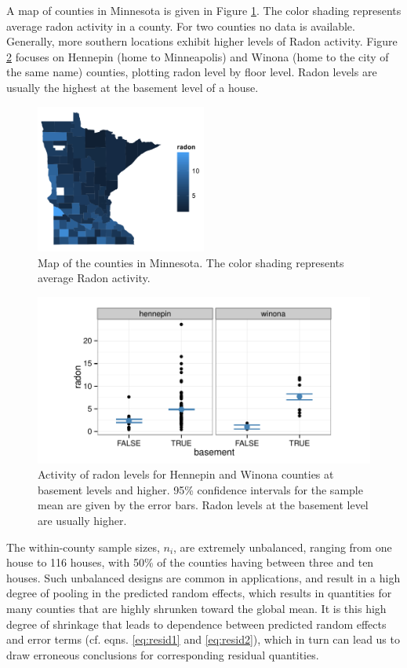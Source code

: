 \documentclass[12pt]{article} %
\begin{document}
A map of counties in Minnesota is given in Figure \ref{fig:map}. The color shading represents average radon activity in a county. For two counties no data is available. Generally, more southern locations exhibit higher  levels of Radon activity. Figure \ref{fig:tc} focuses on Hennepin (home to Minneapolis) and Winona (home to the city of the same name) counties, plotting radon level by floor level. Radon levels are usually the highest at the basement level of a house. 
%
\begin{figure}[htb]
\centering
\includegraphics[width=0.5\textwidth]{figures/map.png}
\caption{\label{fig:map} Map of the counties in Minnesota. The color shading represents average Radon activity.}
\end{figure}
%
\begin{figure}[htb]
\centering
\includegraphics[width=0.7\linewidth]{figures/radon-twocounties.pdf}
\caption{\label{fig:tc} Activity of radon levels for Hennepin and Winona counties at basement levels and higher. 95\% confidence intervals for the sample mean are given by the error bars. Radon levels at the basement level are usually higher.}
\end{figure}
%
The within-county sample sizes, $n_i$, are extremely unbalanced, ranging from one house to 116 houses, with 50\% of the counties having between three and ten houses. Such unbalanced designs are common in applications, and result in a high degree of pooling in the predicted random effects, which results in quantities for many counties that are highly shrunken toward the global mean. It is this high degree of shrinkage that leads to dependence between  predicted random effects and error terms (cf. eqns. \ref{eq:resid1} and \ref{eq:resid2}), which in turn can lead us to draw erroneous conclusions for corresponding residual quantities.
\end{document}
